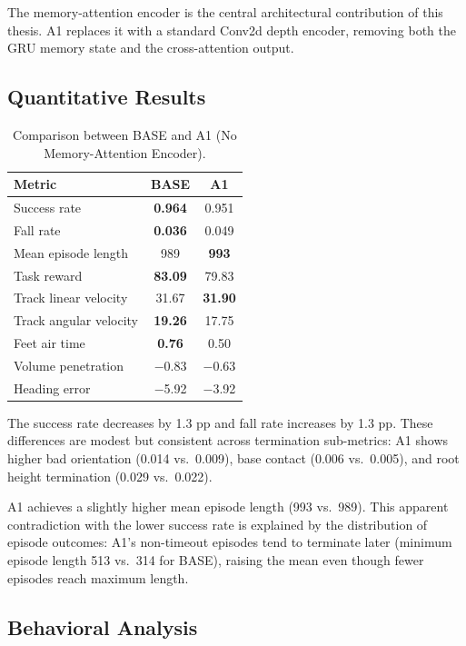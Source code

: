 The memory-attention encoder is the central architectural contribution of this thesis. A1 replaces it with a standard Conv2d depth encoder, removing both the GRU memory state and the cross-attention output.

\subsection{Quantitative Results}

\begin{table}[t]
\centering
\caption{Comparison between BASE and A1 (No Memory-Attention Encoder).}
\label{tab:a1_results}
\begin{tabular}{lcc}
\toprule
\textbf{Metric} & \textbf{BASE} & \textbf{A1} \\
\midrule
Success rate & \textbf{0.964} & 0.951 \\
Fall rate & \textbf{0.036} & 0.049 \\
Mean episode length & 989 & \textbf{993} \\
Task reward & \textbf{83.09} & 79.83 \\
Track linear velocity & 31.67 & \textbf{31.90} \\
Track angular velocity & \textbf{19.26} & 17.75 \\
Feet air time & \textbf{0.76} & 0.50 \\
Volume penetration & $-$0.83 & $-$0.63 \\
Heading error & $-$5.92 & $-$3.92 \\
\bottomrule
\end{tabular}
\end{table}

The success rate decreases by 1.3 pp and fall rate increases by 1.3 pp. These differences are modest but consistent across termination sub-metrics: A1 shows higher bad orientation (0.014 vs.\ 0.009), base contact (0.006 vs.\ 0.005), and root height termination (0.029 vs.\ 0.022).

A1 achieves a slightly higher mean episode length (993 vs.\ 989). This apparent contradiction with the lower success rate is explained by the distribution of episode outcomes: A1's non-timeout episodes tend to terminate later (minimum episode length 513 vs.\ 314 for BASE), raising the mean even though fewer episodes reach maximum length.

\subsection{Behavioral Analysis}

